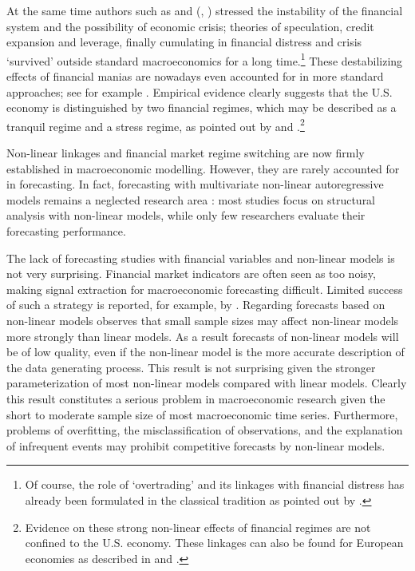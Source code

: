 \documentclass[12pt,letterpaper,fleqn]{article}           %
\begin{document}
At the same time authors such as \textcite{aliber15} and \citeauthor{minsky82} (\citeyear{minsky82}, \citeyear{minsky08}) stressed the instability of the financial system and the possibility of economic crisis; theories of speculation, credit expansion and leverage, finally cumulating in financial distress and crisis `survived' outside standard macroeconomics for a long time.\footnote{Of course, the role of `overtrading' and its linkages with financial distress has already been formulated in the classical tradition as pointed out by \textcite{aliber15}.}
These destabilizing effects of financial manias are nowadays even accounted for in more standard approaches; see for example \textcite{brunnermeier14}. Empirical evidence clearly suggests that the U.S. economy is distinguished by two financial regimes, which may be described as a tranquil regime and a stress regime, as pointed out by \textcite{he14} and \textcite{mittnik13}.\footnote{Evidence on these strong non-linear effects of financial regimes are not confined to the U.S. economy. These linkages can also be found for European economies as described in \textcite{mittnik13} and \textcite{schleer15}.}

Non-linear linkages and financial market regime switching are now firmly established in macroeconomic modelling. However, they are rarely accounted for in forecasting. In fact, forecasting with multivariate non-linear autoregressive models remains a neglected research area \parencite{hubrich13}: most studies focus on structural analysis with non-linear models, while only few researchers evaluate their forecasting performance. 

The lack of forecasting studies with financial variables and non-linear models is not very surprising. Financial market indicators are often seen as too noisy, making signal extraction for macroeconomic forecasting difficult. Limited success of such a strategy is reported, for example, by \textcite{stock03}. Regarding forecasts based on non-linear models \textcite{ter06} observes that small sample sizes may affect non-linear models more strongly than linear models. As a result forecasts of non-linear models will be of low quality, even if the non-linear model is the more accurate description of the data generating process. This result is not surprising given the stronger parameterization of most non-linear models compared with linear models. Clearly this result constitutes a serious problem in macroeconomic research given the short to moderate sample size of most macroeconomic time series. Furthermore, problems of overfitting, the misclassification of observations, and the explanation of infrequent events may prohibit competitive forecasts by non-linear models. 
\end{document}
